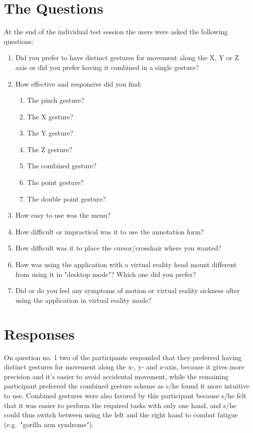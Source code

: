 \section{The Questions}
At the end of the individual test session the users were asked the following questions:

\begin{enumerate}
      \item Did you prefer to have distinct gestures for movement along the X, Y or Z axis or did you prefer having it combined in a single gesture?
      \item How effective and responsive did you find:
      \begin{enumerate}
            \item The pinch gesture?
            \item The X gesture?
            \item The Y gesture?
            \item The Z gesture?
            \item The combined gesture?
            \item The point gesture?
            \item The double point gesture?
      \end{enumerate}
      \item How easy to use was the menu?
      \item How difficult or impractical was it to use the annotation form?
      \item How difficult was it to place the cursor/crosshair where you wanted?     
      \item How was using the application with a virtual reality head mount different from using it in "desktop mode"? 
            Which one did you prefer?
      \item Did or do you feel any symptoms of motion or virtual reality sickness after using the application in virtual reality mode?
\end{enumerate}

\section{Responses}
On question no. 1 two of the participants responded that they preferred having distinct gestures for movement along the x-, y- and z-axis, because 
it gives more precision and it's easier to avoid accidental movement, while the remaining participant preferred the combined gesture scheme as 
s/he found it more intuitive to use. Combined gestures were also favored by this participant because s/he felt that it was easier to perform the 
required tasks with only one hand, and s/he could thus switch between using the left and the right hand to combat fatigue (e.g.~"gorilla arm syndrome").  

